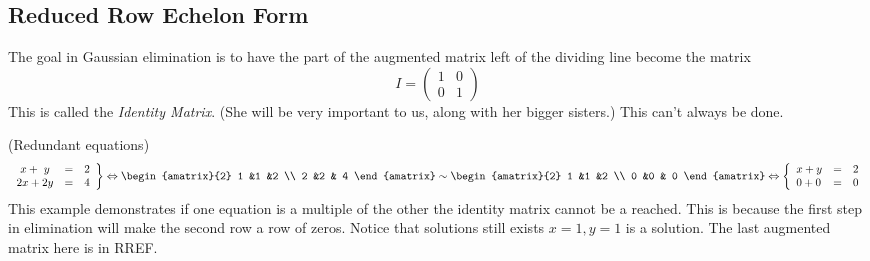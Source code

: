 \subsection{Reduced Row Echelon Form}
The goal in Gaussian elimination is to have the part of the augmented matrix left of the dividing line become the matrix
 \[I=    \begin{pmatrix}
      1             &0  \\
      0             &1
    \end{pmatrix}\] 
This is called the \emph{Identity Matrix}.  
(She will be very important to us, along with her bigger sisters.)
%
This can't always be done.

\begin{example} (Redundant equations)
\[
   \left.
\begin{array}{lcr}
	\ x + \ y & = & 2 \\
	2x + 2y & = &  4
     \end{array}
   \right\} 
   \Leftrightarrow
\begin{amatrix}{2}
1 &1 &2 \\ 2 &2 & 4
\end{amatrix}
\sim
\begin{amatrix}{2}
1 &1 &2 \\ 0 &0 & 0
\end{amatrix}
\Leftrightarrow
\left\{
\begin{array}{lcr}
	x + y & = & 2 \\
	 0 + 0 & = &  0
     \end{array}
   \right.
\]
This example demonstrates if one equation is a multiple of the other the identity matrix cannot be a reached. This is because the first step in elimination will make the second row a row of zeros. Notice that solutions still exists $x=1,y=1$ is a solution. The last augmented matrix here is in RREF.
\end{example}

